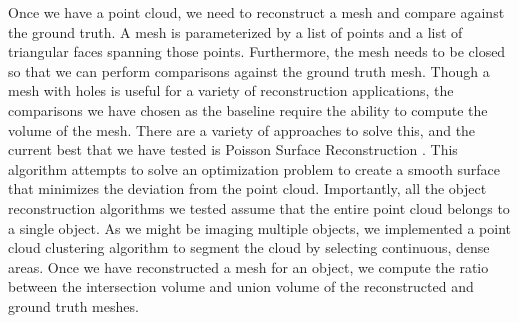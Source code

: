 \documentclass[12pt,letterpaper]{article} %
\begin{document}
Once we have a point cloud, we need to reconstruct a mesh and compare against the ground truth.  A mesh is parameterized by a list of points and a list of triangular faces spanning those points.  Furthermore, the mesh needs to be closed so that we can perform comparisons against the ground truth mesh.  Though a mesh with holes is useful for a variety of reconstruction applications, the comparisons we have chosen as the baseline require the ability to compute the volume of the mesh.  There are a variety of approaches to solve this, and the current best that we have tested is Poisson Surface Reconstruction \cite{10.5555/1281957.1281965}.  This algorithm attempts to solve an optimization problem to create a smooth surface that minimizes the deviation from the point cloud.  Importantly, all the object reconstruction algorithms we tested assume that the entire point cloud belongs to a single object. As we might be imaging multiple objects, we implemented a point cloud clustering algorithm to segment the cloud by selecting continuous, dense areas.  Once we have reconstructed a mesh for an object, we compute the ratio between the intersection volume and union volume of the reconstructed and ground truth meshes.

%

\clearpage
\printbibliography
\end{document}
